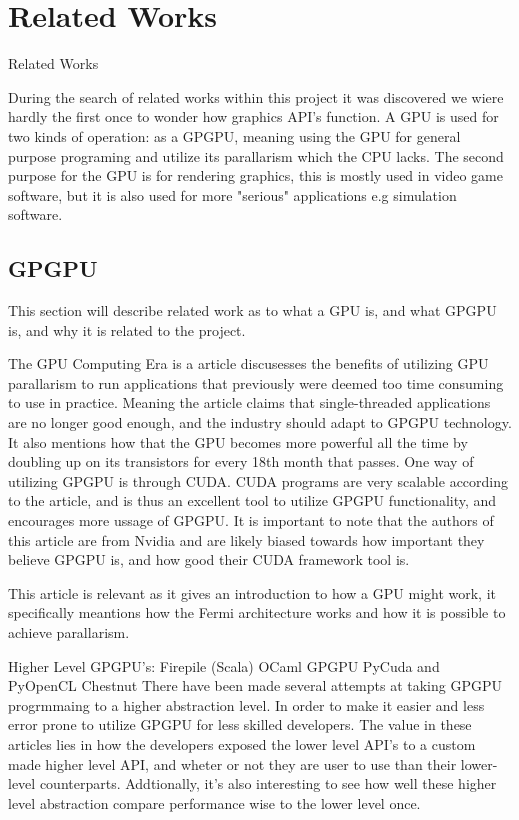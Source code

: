 \section{Related Works}\label{sec:problem_statement}
Related Works

During the search of related works within this project it was discovered we wiere hardly the first once to wonder how graphics API's function. A GPU is used for two kinds of operation: as a GPGPU, meaning using the GPU for general purpose programing and utilize its parallarism which the CPU lacks. 
The second purpose for the GPU is for rendering graphics, this is mostly used in video game software, but it is also used for more "serious" applications e.g simulation software.

\subsection{GPGPU}
This section will describe related work as to what a GPU is, and what GPGPU is, and why it is related to the project.

The GPU Computing Era \cite{gpu_computing_era} is a article discusesses the benefits of utilizing GPU parallarism to run applications that previously were deemed too time consuming to use in practice. 
Meaning the article claims that single-threaded applications are no longer good enough, and the industry should adapt to GPGPU technology. 
It also mentions how that the GPU becomes more powerful all the time by doubling up on its transistors for every 18th month that passes. 
One way of utilizing GPGPU is through CUDA.
CUDA programs are very scalable according to the article, and is thus an excellent tool to utilize GPGPU functionality, and encourages more ussage of GPGPU. It is important to note that the authors of this article are from Nvidia and are likely biased towards how important they believe GPGPU is, and how good their CUDA framework tool is. 

This article is relevant as it gives an introduction to how a GPU might work, it specifically meantions how the Fermi architecture works and how it is possible to achieve parallarism.

Higher Level GPGPU's:
	Firepile (Scala) \cite{2011_firepile}
	OCaml GPGPU \cite{bourgoin_2017_high}
	PyCuda and PyOpenCL \cite{2012_pycuda_pyopencl}
	Chestnut \cite{stromme_2012_chestnut}
There have been made several attempts at taking GPGPU progrmmaing to a higher abstraction level. 
In order to make it easier and less error prone to utilize GPGPU for less skilled developers. 
The value in these articles lies in how the developers exposed the lower level API's to a custom made higher level API, and wheter or not they are user to use than their lower-level counterparts. Addtionally, it's also interesting to see how well these higher level abstraction compare performance wise to the lower level once.

